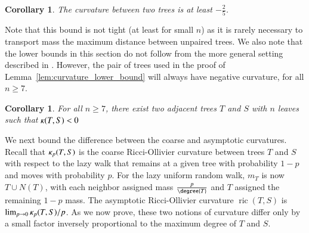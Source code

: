 \documentclass[]{elsarticle}
\newtheorem{cor}[thm]{Corollary}
\newcommand{\curvature}[2][]{%
    \ifthenelse{\equal{#1}{}}%
		{\kappa(#2)}%
		{\kappa_{#1}(#2)}%
}
\newcommand{\ric}[1]{
	\operatorname{ric}(#1)%
}
\begin{document}
\begin{cor}
	The curvature between two trees is at least $-\frac{2}{5}$.
\end{cor}

Note that this bound is not tight (at least for small $n$) as it is rarely necessary to transport mass the maximum distance between unpaired trees.
We also note that the lower bounds in this section do not follow from the more general setting described in \citep{Jost2013-ce}.
However, the pair of trees used in the proof of Lemma~\ref{lem:curvature_lower_bound} will always have negative curvature, for all $n \ge 7$.

\begin{cor}
For all $n \ge 7$, there exist two adjacent trees $T$ and $S$ with $n$ leaves such that $\curvature{T,S} < 0$
\end{cor}

We next bound the difference between the coarse and asymptotic curvatures.
Recall that $\curvature[p]{T,S}$ is the coarse Ricci-Ollivier curvature between trees $T$ and $S$ with respect to the lazy walk that remains at a given tree with probability $1-p$ and moves with probability $p$.
For the lazy uniform random walk, $m_T$ is now $T \cup N(T)$, with each neighbor assigned mass $\frac{p}{\degree{T}}$ and $T$ assigned the remaining $1 - p$ mass.
The asymptotic Ricci-Ollivier curvature $\ric{T,S}$ is $\lim_{p \rightarrow 0} \curvature[p]{T,S} / p$.
As we now prove, these two notions of curvature differ only by a small factor inversely proportional to the maximum degree of $T$ and $S$.
\end{document}
